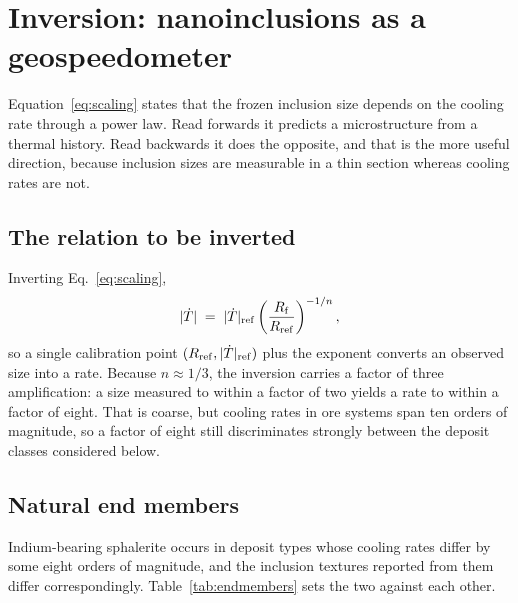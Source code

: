 \documentclass[preprint,12pt,authoryear]{elsarticle}
\begin{document}
\section{Inversion: nanoinclusions as a geospeedometer}
\label{sec:geospeedometer}

Equation~\eqref{eq:scaling} states that the frozen inclusion size depends on the
cooling rate through a power law. Read forwards it predicts a microstructure
from a thermal history. Read backwards it does the opposite, and that is the
more useful direction, because inclusion sizes are measurable in a thin section
whereas cooling rates are not.

\subsection{The relation to be inverted}

Inverting Eq.~\eqref{eq:scaling},
\begin{equation}
\lvert \dot{T} \rvert \;=\; \lvert \dot{T} \rvert_{\rm ref}
      \left( \frac{R_{\rm f}}{R_{\rm ref}} \right)^{-1/n},
\label{eq:invert}
\end{equation}
so a single calibration point $(R_{\rm ref}, |\dot{T}|_{\rm ref})$ plus the
exponent converts an observed size into a rate. Because $n \approx 1/3$, the
inversion carries a factor of three amplification: a size measured to within a
factor of two yields a rate to within a factor of eight. That is coarse, but
cooling rates in ore systems span ten orders of magnitude, so a factor of eight
still discriminates strongly between the deposit classes considered below.

\subsection{Natural end members}

Indium-bearing sphalerite occurs in deposit types whose cooling rates differ by
some eight orders of magnitude, and the inclusion textures reported from them
differ correspondingly. Table~\ref{tab:endmembers} sets the two against each
other.
\end{document}
